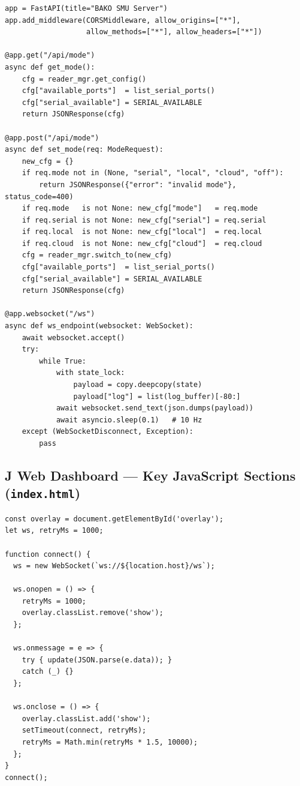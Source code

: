 \begin{lstlisting}[caption={FastAPI endpoints --- mode switching and WebSocket broadcast}, label={lst:py-api}]
app = FastAPI(title="BAKO SMU Server")
app.add_middleware(CORSMiddleware, allow_origins=["*"],
                   allow_methods=["*"], allow_headers=["*"])

@app.get("/api/mode")
async def get_mode():
    cfg = reader_mgr.get_config()
    cfg["available_ports"]  = list_serial_ports()
    cfg["serial_available"] = SERIAL_AVAILABLE
    return JSONResponse(cfg)

@app.post("/api/mode")
async def set_mode(req: ModeRequest):
    new_cfg = {}
    if req.mode not in (None, "serial", "local", "cloud", "off"):
        return JSONResponse({"error": "invalid mode"}, status_code=400)
    if req.mode   is not None: new_cfg["mode"]   = req.mode
    if req.serial is not None: new_cfg["serial"] = req.serial
    if req.local  is not None: new_cfg["local"]  = req.local
    if req.cloud  is not None: new_cfg["cloud"]  = req.cloud
    cfg = reader_mgr.switch_to(new_cfg)
    cfg["available_ports"]  = list_serial_ports()
    cfg["serial_available"] = SERIAL_AVAILABLE
    return JSONResponse(cfg)

@app.websocket("/ws")
async def ws_endpoint(websocket: WebSocket):
    await websocket.accept()
    try:
        while True:
            with state_lock:
                payload = copy.deepcopy(state)
                payload["log"] = list(log_buffer)[-80:]
            await websocket.send_text(json.dumps(payload))
            await asyncio.sleep(0.1)   # 10 Hz
    except (WebSocketDisconnect, Exception):
        pass
\end{lstlisting}

\clearpage

\subsection*{J \quad Web Dashboard --- Key JavaScript Sections (\texttt{index.html})}

\lstset{language=Java, style=bakocode}

\begin{lstlisting}[caption={WebSocket client with auto-reconnect}, label={lst:js-ws}]
const overlay = document.getElementById('overlay');
let ws, retryMs = 1000;

function connect() {
  ws = new WebSocket(`ws://${location.host}/ws`);

  ws.onopen = () => {
    retryMs = 1000;
    overlay.classList.remove('show');
  };

  ws.onmessage = e => {
    try { update(JSON.parse(e.data)); }
    catch (_) {}
  };

  ws.onclose = () => {
    overlay.classList.add('show');
    setTimeout(connect, retryMs);
    retryMs = Math.min(retryMs * 1.5, 10000);
  };
}
connect();
\end{lstlisting}

